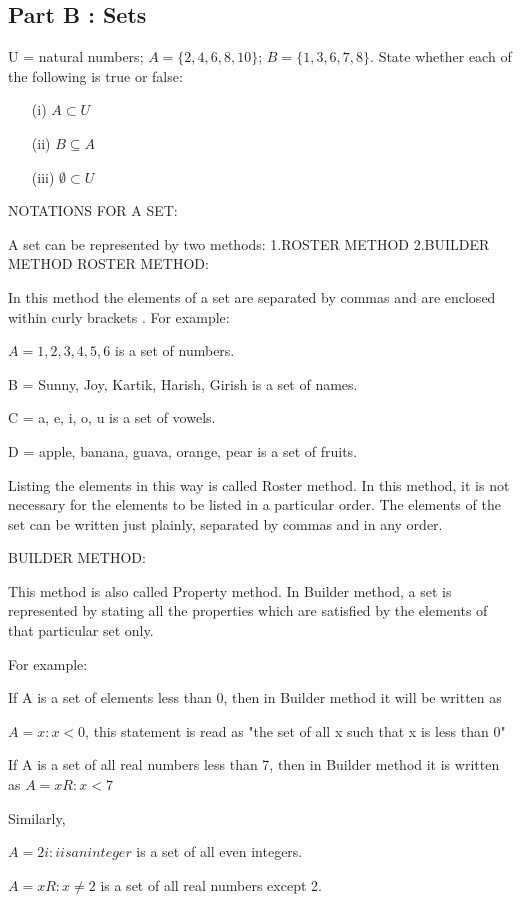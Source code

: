 \documentclass[11pt,a4paper,titlepage,oneside,openany]{article}
\numberwithin{equation}{section}
\numberwithin{algorithm}{section}
\numberwithin{figure}{section}
\numberwithin{table}{section}
\begin{document}
\subsection*{Part B : Sets}
U = {natural numbers}; $A = \{2, 4, 6, 8, 10\}$; $B = \{1, 3, 6, 7, 8\}$. State whether each of the following is true or false:
\begin{itemize}
\item[(i)] $A \subset U$
\item[(ii)] $B \subseteq A$
\item[(iii)] $\emptyset \subset U$
\end{itemize}


NOTATIONS FOR A SET:

A set can be represented by two methods:
1.ROSTER METHOD
2.BUILDER METHOD
ROSTER METHOD:

In this method the elements of a set are separated by commas and are enclosed within curly brackets { }. For example:

$A = {1, 2, 3, 4, 5, 6}$ is a set of numbers.

B = {Sunny, Joy, Kartik, Harish, Girish} is a set of names.

C = {a, e, i, o, u} is a set of vowels.

D = {apple, banana, guava, orange, pear} is a set of fruits.

Listing the elements in this way is called Roster method. In this method, it is not necessary for the elements to be listed in a particular order. The elements of the set can be written just plainly, separated by commas and in any order.


BUILDER METHOD:

This method is also called Property method. In Builder method, a set is represented by stating all the properties which are satisfied by the elements of that particular set only.

For example:

If A is a set of elements less than 0, then in Builder method it will be written as

$A = {x: x < 0}$, this statement is read as "the set of all x such that x is less than 0"

If A is a set of all real numbers less than 7, then in Builder method it is written as $A = {x   R: x < 7}$

Similarly,

$A = {2i: i is an integer}$ is a set of all even integers.

$A = {x   R: x \neq 2}$ is a set of all real numbers except 2.
\end{document}
